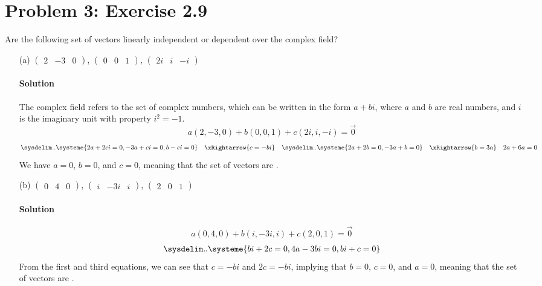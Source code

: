 \documentclass{article}
\begin{document}
	\section*{Problem 3: Exercise 2.9}
	Are the following set of vectors linearly independent or dependent over the complex field?
	\begin{enumerate}
		\item[(a)]
		$\begin{pmatrix} 2 & -3 & 0 \end{pmatrix}$,
		$\begin{pmatrix} 0 & 0 & 1 \end{pmatrix}$,
		$\begin{pmatrix} 2i & i & -i \end{pmatrix}$
		\paragraph{Solution} The complex field refers to the set of complex numbers, which can be written in the form $a+bi$, where $a$ and $b$ are real numbers, and $i$ is the imaginary unit with property $i^2 = -1$.
		\[
			a \left( 2, -3, 0 \right) + b \left( 0, 0, 1 \right) + c \left( 2i, i, -i \right) = \vec{0}
		\]
		\begin{equation*}
			\begin{split}
				\sysdelim..\systeme{
				2a + 2ci = 0,
				-3a + ci = 0,
				b - ci = 0
			}
			\end{split}
			\quad \xRightarrow{c=-bi} \quad 
			\begin{split}
				\sysdelim..\systeme{
				2a + 2b = 0,
				-3a + b = 0
			}
			\end{split}
			\quad \xRightarrow{b=3a} \quad 
			\begin{split}
				2a + 6a = 0
			\end{split}
		\end{equation*}
		We have $a=0$, $b=0$, and $c=0$, meaning that the set of vectors are .
		
		\item[(b)]
		$\begin{pmatrix} 0 & 4 & 0 \end{pmatrix}$,
		$\begin{pmatrix} i & -3i & i \end{pmatrix}$,
		$\begin{pmatrix} 2 & 0 & 1 \end{pmatrix}$
		\paragraph{Solution}
		\[
		a \left( 0, 4, 0\right) + b \left( i, -3i, i \right) + c \left( 2, 0, 1 \right) = \vec{0}
		\]
		\begin{equation*}
			\begin{split}
				\sysdelim..\systeme{
					bi + 2c = 0,
					4a  - 3bi = 0,
					bi + c = 0
				}
			\end{split}
		\end{equation*}
		From the first and third equations, we can see that $c=-bi$ and $2c = -bi$, implying that $b=0$, $c=0$, and $a=0$, meaning that the set of vectors are .
		

\end{enumerate}
\end{document}
